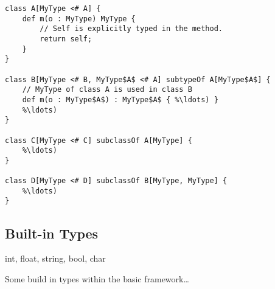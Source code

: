 \begin{lstlisting}[float,language=ooplss,caption=Explicit \mytype,label=lst:explicitMyType]
class A[MyType <# A] {
	def m(o : MyType) MyType {
		// Self is explicitly typed in the method.
		return self;
	}
}

class B[MyType <# B, MyType$A$ <# A] subtypeOf A[MyType$A$] {
	// MyType of class A is used in class B
	def m(o : MyType$A$) : MyType$A$ { %\ldots) }
	%\ldots)
}

class C[MyType <# C] subclassOf A[MyType] {
	%\ldots)
}

class D[MyType <# D] subclassOf B[MyType, MyType] {
	%\ldots)
}
\end{lstlisting}




\subsection{Built-in Types}

int, float, string, bool, char


Some build in types within the basic framework\ldots

